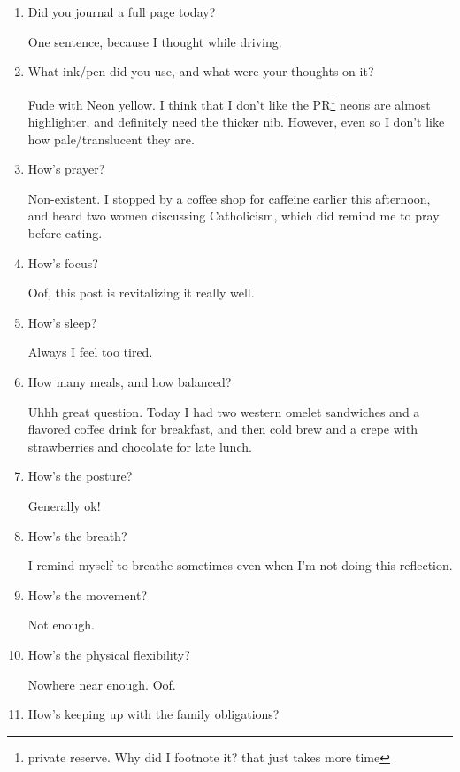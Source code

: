 \documentclass[12pt]{article}
\renewcommand{\,}{\textsuperscript{,}}
\begin{document}
\begin{enumerate}

\item Did you journal a full page today?

One sentence, because I thought while driving.

\item What ink/pen did you use, and what were your thoughts on it?

Fude with Neon yellow. I think that I don't like the PR\footnote{private reserve. Why did I footnote it? that just takes more time} neons are almost highlighter, and definitely need the thicker nib. However, even so I don't like how pale/translucent they are.

\item How's prayer?

Non-existent. I stopped by a coffee shop for caffeine earlier this afternoon, and heard two women discussing Catholicism, which did remind me to pray before eating.

\item How's focus?

Oof, this post is revitalizing it really well.

\item How's sleep?

Always I feel too tired.

\item How many meals, and how balanced?

Uhhh great question.  
Today I had two western omelet sandwiches and a flavored coffee drink for breakfast, and then cold brew and a crepe with strawberries and chocolate for late lunch.

\item How's the posture?

Generally ok!

\item How's the breath?

I remind myself to breathe sometimes even when I'm not doing this reflection.

\item How's the movement?

Not enough.

\item How's the physical flexibility?

Nowhere near enough. Oof.

\item How's keeping up with the family obligations?


\end{enumerate}
\end{document}
